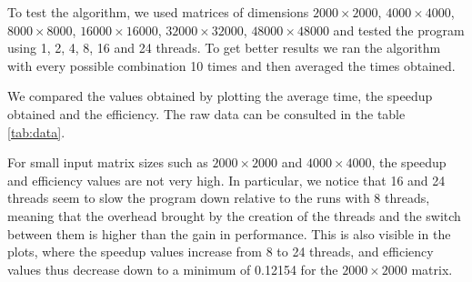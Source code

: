 \documentclass{article}
\begin{document}
To test the algorithm, we used matrices of dimensions $2000\times2000$, $4000\times4000$, $8000\times8000$, $16000\times16000$, $32000\times32000$, $48000\times48000$ and tested the program using 1, 2, 4, 8, 16 and 24 threads. To get better results we ran the algorithm with every possible combination 10 times and then averaged the times obtained.

We compared the values obtained by plotting the average time, the speedup obtained and the efficiency. The raw data can be consulted in the table \ref{tab:data}.

\begin{figure}[H]
   \centering
   \label{img:time}
   \qquad
   \label{img:speedup}
   \qquad
   \label{img:efficiency}
   \label{fig:fig1}
\end{figure}

For small input matrix sizes such as $2000\times2000$ and $4000\times4000$, the speedup and efficiency values are not very high. In particular,
we notice that 16 and 24 threads seem to slow the program down relative to the runs with 8 threads, meaning that the overhead brought by the creation of the threads and the switch between them is higher than the gain in performance. This is also visible in the plots, where the speedup values increase from 8 to 24 threads, and efficiency values thus decrease down to a minimum of 0.12154 for the $2000\times2000$ matrix.
\end{document}
